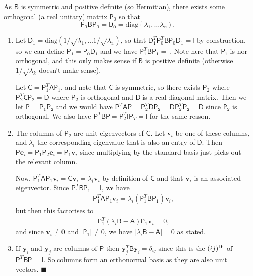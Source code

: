 \documentclass[letter-paper]{tufte-book}
\newenvironment{proof}[1][Proof]{\begin{trivlist}
\item[\hskip \labelsep {\bfseries #1}]}{\end{trivlist}}
\newcommand{\As}{{\mathsf{A}}}
\newcommand{\Bs}{{\mathsf{B}}}
\newcommand{\Cs}{{\mathsf{C}}}
\newcommand{\Ds}{{\mathsf{D}}}
\newcommand{\Is}{{\mathsf{I}}}
\newcommand{\Ps}{{\mathsf{P}}}
\newcommand{\Ob}{{\boldsymbol{0}}}
\newcommand{\eb}{{\boldsymbol{e}}}
\newcommand{\vb}{{\boldsymbol{v}}}
\newcommand{\yb}{{\boldsymbol{y}}}
\newcommand{\qed}{\hfill$\blacksquare$}
\begin{document}
\begin{proof}
  As $\Bs$ is symmetric and positive definite (so Hermitian), there exists some orthogonal (a real unitary) matrix $\Ps_0$ so that
  \begin{equation*}
    \Ps_0 \Bs \Ps_0 = \Ds_0 = \mbox{diag}(\lambda_1, \ldots \lambda_n).
  \end{equation*}
  
  \begin{enumerate}
    \item Let $\Ds_1 = \mbox{diag}(1/\sqrt{\lambda_1}, \ldots 1/\sqrt{\lambda_n})$, so that $\Ds_1^T \Ps_0^T \Bs \Ps_0 \Ds_1 = \Is$ by construction, so we can define $\Ps_1 = \Ps_0 \Ds_1$ and we have $\Ps_1^T \Bs \Ps_1 = \Is$. Note here that $\Ps_1$ is nor orthogonal, and this only makes sense if $\Bs$ is positive definite (otherwise $1/\sqrt{\lambda_k}$ doesn't make sense).
    
    Let $\Cs = \Ps_1^T \As \Ps_1$, and note that $\Cs$ is symmetric, so there exists $\Ps_2$ where $\Ps_2^T \Cs \Ps_2 = \Ds$ where $\Ps_2$ is orthogonal and $\Ds$ is a real diagonal matrix. Then we let $\Ps = \Ps_1 \Ps_2$ and we would have $\Ps^T \As \Ps = \Ps_2^T \Ds \Ps_2 = \Ds \Ps_2^T \Ps_2 = \Ds$ since $\Ps_2$ is orthogonal. We also have $\Ps^T \Bs \Ps = \Ps_2^T \Is \Ps_T = \Is$ for the same reason.
    
    \item The columns of $\Ps_2$ are unit eigenvectors of $\Cs$. Let $\vb_i$ be one of these columns, and $\lambda_i$ the corresponding eigenvalue that is also an entry of $\Ds$. Then $\Ps\eb_i = \Ps_1 \Ps_2 \eb_i = \Ps_1 \vb_i$ since multiplying by the standard basis just picks out the relevant column. 
    
    Now, $\Ps_1^T \As \Ps_1 \vb_i = \Cs \vb_i = \lambda_i \vb_i$ by definition of $\Cs$ and that $\vb_i$ is an associated eigenvector. Since $\Ps_1^T \Bs \Ps_1 = \Is$, we have
    \begin{align*}
      \Ps_1^T \As \Ps_1 \vb_i = \lambda_i (\Ps_1^T \Bs \Ps_1) \vb_i,
    \end{align*}
    but then this factorises to
    \begin{align*}
      \Ps_1^T (\lambda_i \Bs - \As) \Ps_1 \vb_i = 0,
    \end{align*}
    and since $\vb_i \neq \Ob$ and $|\Ps_1|\neq 0$, we have $|\lambda_i \Bs - \As| = 0$ as stated.
    
    \item If $\yb_i$ and $\yb_j$ are columns of $\Ps$ then $\yb_j^T \Bs \yb_i = \delta_{ij}$ since this is the $(ij)^{\tiny \textnormal{th}}$ of $\Ps^T \Bs \Ps = \Is$. So columns form an orthonormal basis as they are also unit vectors. \qed
  \end{enumerate}
\end{proof}
\end{document}
